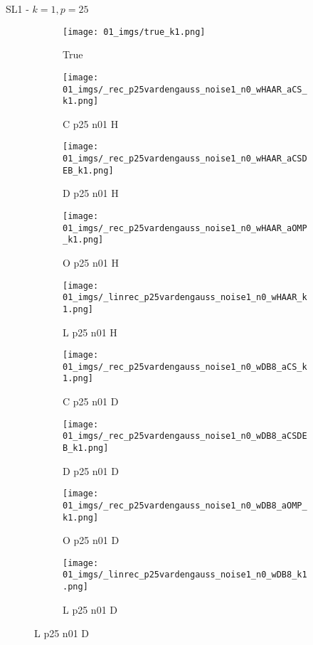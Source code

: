 \begin{frame}{SL1 - $k=1,p=25$}{}
\begin{figure}
\begin{subfigure}{0.1\textwidth}
\texttt{[image: 01\_imgs/true\_k1.png]}
\caption*{\Tiny True}
\end{subfigure}
\begin{subfigure}{0.1\textwidth}
\texttt{[image: 01\_imgs/\_rec\_p25vardengauss\_noise1\_n0\_wHAAR\_aCS\_k1.png]}
\caption*{\Tiny C p25 n01 H}
\end{subfigure}
\begin{subfigure}{0.1\textwidth}
\texttt{[image: 01\_imgs/\_rec\_p25vardengauss\_noise1\_n0\_wHAAR\_aCSDEB\_k1.png]}
\caption*{\Tiny D p25 n01 H}
\end{subfigure}
\begin{subfigure}{0.1\textwidth}
\texttt{[image: 01\_imgs/\_rec\_p25vardengauss\_noise1\_n0\_wHAAR\_aOMP\_k1.png]}
\caption*{\Tiny O p25 n01 H}
\end{subfigure}
\begin{subfigure}{0.1\textwidth}
\texttt{[image: 01\_imgs/\_linrec\_p25vardengauss\_noise1\_n0\_wHAAR\_k1.png]}
\caption*{\Tiny L p25 n01 H}
\end{subfigure}
\begin{subfigure}{0.1\textwidth}
\texttt{[image: 01\_imgs/\_rec\_p25vardengauss\_noise1\_n0\_wDB8\_aCS\_k1.png]}
\caption*{\Tiny C p25 n01 D}
\end{subfigure}
\begin{subfigure}{0.1\textwidth}
\texttt{[image: 01\_imgs/\_rec\_p25vardengauss\_noise1\_n0\_wDB8\_aCSDEB\_k1.png]}
\caption*{\Tiny D p25 n01 D}
\end{subfigure}
\begin{subfigure}{0.1\textwidth}
\texttt{[image: 01\_imgs/\_rec\_p25vardengauss\_noise1\_n0\_wDB8\_aOMP\_k1.png]}
\caption*{\Tiny O p25 n01 D}
\end{subfigure}
\begin{subfigure}{0.1\textwidth}
\texttt{[image: 01\_imgs/\_linrec\_p25vardengauss\_noise1\_n0\_wDB8\_k1.png]}
\caption*{\Tiny L p25 n01 D}
\end{subfigure}


\vspace{5pt}


\end{figure}
\end{frame}
